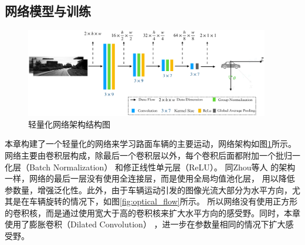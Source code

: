 \subsection{网络模型与训练}
\label{sec:model}
\label{sec:approach}
\begin{figure}[t]
    \centering
    \includegraphics[width=0.95\textwidth]{datavo/network_structure_2-crop.pdf}
    \caption{轻量化网络架构结构图}
    \label{fig:nerwork_structure}
\end{figure}

本章构建了一个轻量化的网络来学习路面车辆的主要运动，网络架构如图\ref{fig:nerwork_structure}所示。
网络主要由卷积层构成，除最后一个卷积层以外，每个卷积后面都附加一个批归一化层（Batch Normalization） \cite{wu2018group} 和修正线性单元层（ReLU）。
同Zhou等人 \cite{zhou2017unsupervised}的架构一样，网络的最后一层没有使用全连接层，而是使用全局均值池化层\cite{lin2013network}，
用以降低参数量，增强泛化性。此外，由于车辆运动引发的图像光流大部分为水平方向，尤其是在车辆旋转的情况下，如图\ref{fig:optical_flow}所示。
所以网络没有使用正方形的卷积核，而是通过使用宽大于高的卷积核来扩大水平方向的感受野。同时，本章使用了膨胀卷积（Dilated Convolution） \cite{yu2015multi}，进一步在参数量相同的情况下扩大感受野。

